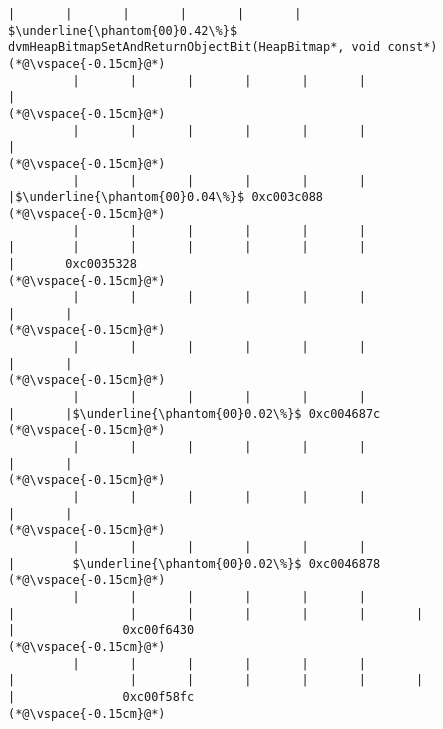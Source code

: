 \begin{lstlisting}[caption=NewDirectByteBuffer, label=profile:C2JNewDirectBuffer-512, numberbychapter=true, frame=lines, float, floatplacement=t]
         |       |       |       |       |       |                                $\underline{\phantom{00}0.42\%}$ dvmHeapBitmapSetAndReturnObjectBit(HeapBitmap*, void const*)
(*@\vspace{-0.15cm}@*)
         |       |       |       |       |       |                                       |
(*@\vspace{-0.15cm}@*)
         |       |       |       |       |       |                                       |
(*@\vspace{-0.15cm}@*)
         |       |       |       |       |       |                                       |$\underline{\phantom{00}0.04\%}$ 0xc003c088
(*@\vspace{-0.15cm}@*)
         |       |       |       |       |       |                                       |        |       |       |       |       |       |                                       |       0xc0035328
(*@\vspace{-0.15cm}@*)
         |       |       |       |       |       |                                       |       |
(*@\vspace{-0.15cm}@*)
         |       |       |       |       |       |                                       |       |
(*@\vspace{-0.15cm}@*)
         |       |       |       |       |       |                                       |       |$\underline{\phantom{00}0.02\%}$ 0xc004687c
(*@\vspace{-0.15cm}@*)
         |       |       |       |       |       |                                       |       |
(*@\vspace{-0.15cm}@*)
         |       |       |       |       |       |                                       |       |
(*@\vspace{-0.15cm}@*)
         |       |       |       |       |       |                                       |        $\underline{\phantom{00}0.02\%}$ 0xc0046878
(*@\vspace{-0.15cm}@*)
         |       |       |       |       |       |                                       |                |       |       |       |       |       |                                       |               0xc00f6430
(*@\vspace{-0.15cm}@*)
         |       |       |       |       |       |                                       |                |       |       |       |       |       |                                       |               0xc00f58fc
(*@\vspace{-0.15cm}@*)

\end{lstlisting}
